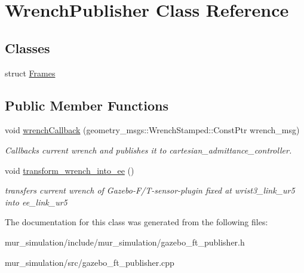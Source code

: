 \hypertarget{classWrenchPublisher}{}\section{Wrench\+Publisher Class Reference}
\label{classWrenchPublisher}
\subsection*{Classes}
\begin{DoxyCompactItemize}
\item 
struct \hyperlink{structWrenchPublisher_1_1Frames}{Frames}
\end{DoxyCompactItemize}
\subsection*{Public Member Functions}
\begin{DoxyCompactItemize}
\item 
\mbox{\label{classWrenchPublisher_a418dba02ad920b09c1b3948750a2934d}} 
void \hyperlink{classWrenchPublisher_a418dba02ad920b09c1b3948750a2934d}{wrench\+Callback} (geometry\+\_\+msgs\+::\+Wrench\+Stamped\+::\+Const\+Ptr wrench\+\_\+msg)
\begin{DoxyCompactList}\small\item\em Callbacks current wrench and publishes it to cartesian\+\_\+admittance\+\_\+controller. \end{DoxyCompactList}\item 
\mbox{\label{classWrenchPublisher_a2364056bf9eaa8dfc7d4021107c89e10}} 
void \hyperlink{classWrenchPublisher_a2364056bf9eaa8dfc7d4021107c89e10}{transform\+\_\+wrench\+\_\+into\+\_\+ee} ()
\begin{DoxyCompactList}\small\item\em transfers current wrench of Gazebo-\/\+F/\+T-\/sensor-\/plugin fixed at \textquotesingle{}wrist3\+\_\+link\+\_\+ur5\textquotesingle{} into \textquotesingle{}ee\+\_\+link\+\_\+ur5\textquotesingle{} \end{DoxyCompactList}\end{DoxyCompactItemize}


The documentation for this class was generated from the following files\+:\begin{DoxyCompactItemize}
\item 
mur\+\_\+simulation/include/mur\+\_\+simulation/gazebo\+\_\+ft\+\_\+publisher.\+h\item 
mur\+\_\+simulation/src/gazebo\+\_\+ft\+\_\+publisher.\+cpp\end{DoxyCompactItemize}
